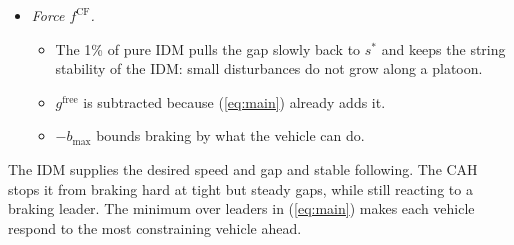 \documentclass[11pt]{article}
\begin{document}
\begin{itemize}
\begin{itemize}
\item $a_{\mathrm{IDM}}>a_{\mathrm{CAH}}$: the IDM is already milder than the
kinematics require and is kept.
\item Otherwise, as after a cut-in, the CAH value is used. Since $\tanh\ge-1$,
braking exceeds the CAH value by at most $b$, and there is no jump at the
switch.
\end{itemize}
\item \emph{Force $f^{\mathrm{CF}}$.}
\begin{itemize}
\item The 1\% of pure IDM pulls the gap slowly back to $s^*$ and keeps the
string stability of the IDM: small disturbances do not grow along a platoon.
\item $g^{\mathrm{free}}$ is subtracted because (\ref{eq:main}) already adds it.
\item $-b_{\max}$ bounds braking by what the vehicle can do.
\end{itemize}
\end{itemize}
The IDM supplies the desired speed and gap and stable following. The CAH stops
it from braking hard at tight but steady gaps, while still reacting to a
braking leader. The minimum over leaders in (\ref{eq:main}) makes each vehicle
respond to the most constraining vehicle ahead.
\end{document}
